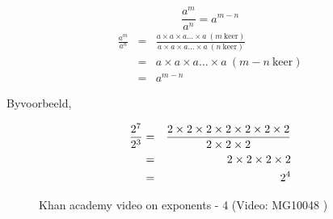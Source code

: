 {
$$ \frac{ {a}^{m} }{ {a}^{n} }={a}^{m-n}$$
\begin{eqnarray*}
\frac{a^m}{a^n} &=& \frac{a \times a \times a \ldots \times a ~ (m~\mbox{keer})} {a \times a \times a \ldots \times a ~ (n~\mbox{keer})} \\
&= & a \times a \times a \ldots \times a ~ (m-n~\mbox{keer}) \\
&= & a^{m-n}
\end{eqnarray*}

}




          
\label{m38359*id65293}Byvoorbeeld,

\begin{eqnarray*}
    \dfrac{{2}^{7}}{{2}^{3}}& =& \dfrac{2\ensuremath{\times}2\ensuremath{\times}2\ensuremath{\times}2\ensuremath{\times}2\ensuremath{\times}2\ensuremath{\times}2}{2\ensuremath{\times}2\ensuremath{\times}2}\hfill \\
						     & =& 2\ensuremath{\times}2\ensuremath{\times}2\ensuremath{\times}2\hfill \\
						     & =& {2}^{4}\hfill \hfill 
\end{eqnarray*}

\setcounter{subfigure}{0}
\begin{figure}[H] %
\textnormal{Khan academy video on exponents - 4}\vspace{.1in} \nopagebreak
\label{m38359*yt-media6}\label{m38359*yt-video6}
 { (Video:  MG10048 )}
\end{figure}       


